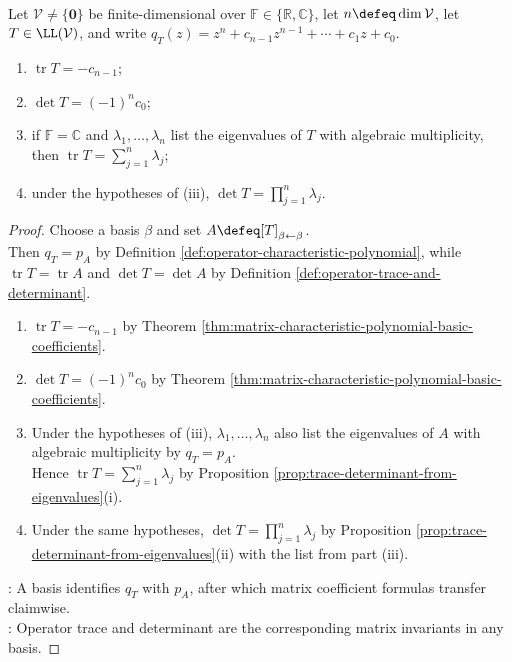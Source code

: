 \begin{proposition} \label{prop:operator-trace-determinant-characteristic-coefficients} \\
Let $\mathcal{V}\neq\{\mathbf{0}\}$ be finite-dimensional over $\mathbb{F}\in\{\mathbb{R},\mathbb{C}\}$, let $n\defeq\dim\mathcal{V}$, let $T\in\LL(\mathcal{V})$, and write $q_T(z)=z^n+c_{n-1}z^{n-1}+\cdots+c_1z+c_0$.
\begin{enumerate}[label=(\roman*)]
\setlength{\itemsep}{0pt}
\item $\operatorname{tr}T=-c_{n-1}$;
\item $\det T=(-1)^nc_0$;
\item if $\mathbb{F}=\mathbb{C}$ and $\lambda_1,\ldots,\lambda_n$ list the eigenvalues of $T$ with algebraic multiplicity, then $\operatorname{tr}T=\sum\limits_{j=1}^{n}\lambda_j$;
\item under the hypotheses of (iii), $\det T=\prod\limits_{j=1}^{n}\lambda_j$.
\end{enumerate}
\begin{proof}
Choose a basis $\beta$ and set $A\defeq[T]_{\beta\leftarrow\beta}$.\\
Then $q_T=p_A$ by Definition \ref{def:operator-characteristic-polynomial}, while $\operatorname{tr}T=\operatorname{tr}A$ and $\det T=\det A$ by Definition \ref{def:operator-trace-and-determinant}.
\begin{enumerate}[label=(\roman*)]
\setlength{\itemsep}{0pt}
\item $\operatorname{tr}T=-c_{n-1}$ by Theorem \ref{thm:matrix-characteristic-polynomial-basic-coefficients}.
\item $\det T=(-1)^nc_0$ by Theorem \ref{thm:matrix-characteristic-polynomial-basic-coefficients}.
\item Under the hypotheses of (iii), $\lambda_1,\ldots,\lambda_n$ also list the eigenvalues of $A$ with algebraic multiplicity by $q_T=p_A$.\\
Hence $\operatorname{tr}T=\sum\limits_{j=1}^{n}\lambda_j$ by Proposition \ref{prop:trace-determinant-from-eigenvalues}(i).
\item Under the same hypotheses, $\det T=\prod\limits_{j=1}^{n}\lambda_j$ by Proposition \ref{prop:trace-determinant-from-eigenvalues}(ii) with the list from part (iii).
\end{enumerate}
: A basis identifies $q_T$ with $p_A$, after which matrix coefficient formulas transfer claimwise.\\
: Operator trace and determinant are the corresponding matrix invariants in any basis.
\end{proof}
\end{proposition}
